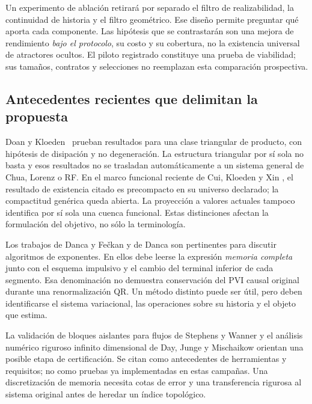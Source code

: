 Un experimento de ablación retirará por separado el filtro de realizabilidad,
la continuidad de historia y el filtro geométrico. Ese diseño permite
preguntar qué aporta cada componente. Las hipótesis que se contrastarán son
una mejora de rendimiento \emph{bajo el protocolo}, su costo y su cobertura,
no la existencia universal de atractores ocultos. El piloto registrado
constituye una prueba de viabilidad; sus tamaños, contratos y selecciones no
reemplazan esta comparación prospectiva.

\subsection{Antecedentes recientes que delimitan la propuesta}

Doan y Kloeden~\cite{DoanKloeden2022Triangular} prueban resultados para una
clase triangular de producto, con hipótesis de disipación y no degeneración.
La estructura triangular por sí sola no basta y esos resultados no se
trasladan automáticamente a un sistema general de Chua, Lorenz o RF. En el
marco funcional reciente de Cui, Kloeden y Xin
\cite{CuiKloedenXin2026CaputoDynamics}, el resultado de existencia citado es
precompacto en su universo declarado; la compactitud genérica queda abierta.
La proyección a valores actuales tampoco identifica por sí sola una cuenca
funcional. Estas distinciones afectan la formulación del objetivo, no sólo
la terminología.

Los trabajos de Danca y Fečkan y de Danca
\cite{DancaFeckan2024MemoryPrinciple,Danca2026ImprovedLyapunov} son pertinentes
para discutir algoritmos de exponentes. En ellos debe leerse la expresión
\emph{memoria completa} junto con el esquema impulsivo y el cambio del
terminal inferior de cada segmento. Esa denominación no demuestra
conservación del PVI causal original durante una renormalización QR.
Un método distinto puede ser útil, pero deben identificarse el sistema
variacional, las operaciones sobre su historia y el objeto que estima.

La validación de bloques aislantes para flujos de Stephens y Wanner
\cite{StephensWanner2014IsolatingBlocks} y el análisis numérico riguroso
infinito dimensional de Day, Junge y Mischaikow
\cite{DayJungeMischaikow2004InfiniteDimensional} orientan una posible etapa
de certificación. Se citan como antecedentes de herramientas y requisitos;
no como pruebas ya implementadas en estas campañas. Una discretización de
memoria necesita cotas de error y una transferencia rigurosa al sistema
original antes de heredar un índice topológico.

